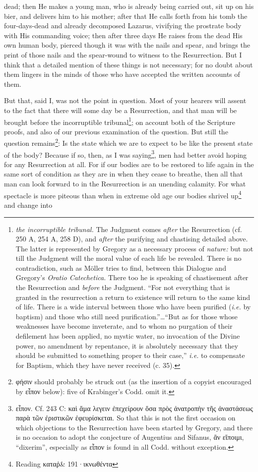 dead; then He makes a young man, who is already being carried out, sit up on his bier, and delivers him to his mother; after that He calls forth from his tomb the four-days-dead and already decomposed Lazarus, vivifying the prostrate body with His commanding voice; then after three days He raises from the dead His own human body, pierced though it was with the nails and spear, and brings the print of those nails and the spear-wound to witness to the Resurrection. But I think that a detailed mention of these things is not necessary; for no doubt about them lingers in the minds of those who have accepted the written accounts of them.

But that, said I, was not the point in question. Most of your hearers will assent to the fact that there will some day be a Resurrection, and that man will be brought before the incorruptible tribunal\footnote{\emph{the incorruptible tribunal.} The Judgment comes \emph{after} the Resurrection (cf. 250 A, 254 A, 258 D), and \emph{after} the purifying and chastising detailed above. The latter is represented by Gregory as a necessary process of \emph{nature:} but not till the Judgment will the moral value of each life be revealed. There is no contradiction, such as Möller tries to find, between this Dialogue and Gregory’s \emph{Oratio Catechetica.} There too he is speaking of chastisement after the Resurrection and \emph{before} the Judgment. “For not everything that is granted in the resurrection a return to existence will return to the same kind of life. There is a wide interval between those who have been purified (\emph{i.e.} by baptism) and those who still need purification.”…“But as for those whose weaknesses have become inveterate, and to whom no purgation of their defilement has been applied, no mystic water, no invocation of the Divine power, no amendment by repentance, it is absolutely necessary that they should be submitted to something proper to their case,” \emph{i.e.} to compensate for Baptism, which they have never received (c. 35).}; on account both of the Scripture proofs, and also of our previous examination of the question. But still the question remains\footnote{\textgreek{φήσιν} should probably be struck out (as the insertion of a copyist encouraged by \textgreek{εἶπον} below): five of Krabinger’s Codd. omit it.}: Is the state which we are to expect to be like the present state of the body? Because if so, then, as I was saying\footnote{\textgreek{εἶπον}. Cf. 243 C: \textgreek{καὶ ἅμα λεγειν ἐπεχείρουν ὅσα πρὸς ἀνατροπὴν τῆς ἀναστάσεως παρὰ τῶν ἐριστικῶν ἐφευρίσκεται}. So that this is not the first occasion on which objections to the Resurrection have been started by Gregory, and there is no occasion to adopt the conjecture of Augentius and Sifanus, \textgreek{ἂν εἴποιμι}, “dixerim”, especially as \textgreek{εἶπον} is found in all Codd. without exception.}, men had better avoid hoping for any Resurrection at all. For if our bodies are to be restored to life again in the same sort of condition as they are in when they cease to breathe, then all that man can look forward to in the Resurrection is an unending calamity. For what spectacle is more piteous than when in extreme old age our bodies shrivel up\footnote{Reading \textgreek{καταῤ\& 191·ικνωθέντα}} and change into 